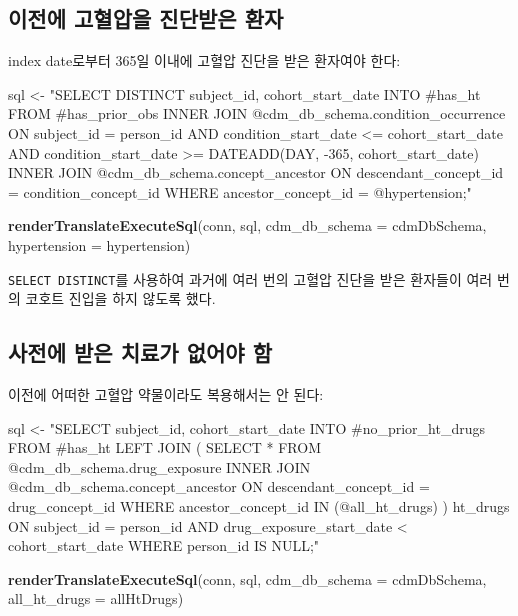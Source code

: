 \documentclass[11pt]{book}
\newenvironment{Shaded}{\begin{snugshade}}{\end{snugshade}}
\newcommand{\KeywordTok}[1]{\textcolor[rgb]{0.13,0.29,0.53}{\textbf{#1}}}
\newcommand{\DataTypeTok}[1]{\textcolor[rgb]{0.13,0.29,0.53}{#1}}
\newcommand{\StringTok}[1]{\textcolor[rgb]{0.31,0.60,0.02}{#1}}
\newcommand{\NormalTok}[1]{#1}
\theoremstyle{definition}
\theoremstyle{definition}
\theoremstyle{definition}
\theoremstyle{remark}
\begin{document}
\subsection{이전에 고혈압을 진단받은 환자}\label{---}

index date로부터 365일 이내에 고혈압 진단을 받은 환자여야 한다:

\begin{Shaded}
\begin{Highlighting}[]
\NormalTok{sql <-}\StringTok{ "SELECT DISTINCT subject_id,}
\StringTok{  cohort_start_date}
\StringTok{INTO #has_ht}
\StringTok{FROM #has_prior_obs}
\StringTok{INNER JOIN @cdm_db_schema.condition_occurrence}
\StringTok{  ON subject_id = person_id}
\StringTok{    AND condition_start_date <= cohort_start_date}
\StringTok{    AND condition_start_date >= DATEADD(DAY, -365, cohort_start_date)}
\StringTok{INNER JOIN @cdm_db_schema.concept_ancestor}
\StringTok{  ON descendant_concept_id = condition_concept_id}
\StringTok{WHERE ancestor_concept_id = @hypertension;"}

\KeywordTok{renderTranslateExecuteSql}\NormalTok{(conn,}
\NormalTok{                          sql,}
                          \DataTypeTok{cdm_db_schema =}\NormalTok{ cdmDbSchema,}
                          \DataTypeTok{hypertension =}\NormalTok{ hypertension)}
\end{Highlighting}
\end{Shaded}

\texttt{SELECT\ DISTINCT}를 사용하여 과거에 여러 번의 고혈압 진단을 받은
환자들이 여러 번의 코호트 진입을 하지 않도록 했다.

\subsection{사전에 받은 치료가 없어야 함}\label{----}

이전에 어떠한 고혈압 약물이라도 복용해서는 안 된다:

\begin{Shaded}
\begin{Highlighting}[]
\NormalTok{sql <-}\StringTok{ "SELECT subject_id,}
\StringTok{  cohort_start_date}
\StringTok{INTO #no_prior_ht_drugs}
\StringTok{FROM #has_ht}
\StringTok{LEFT JOIN (}
\StringTok{  SELECT *}
\StringTok{  FROM @cdm_db_schema.drug_exposure}
\StringTok{  INNER JOIN @cdm_db_schema.concept_ancestor}
\StringTok{    ON descendant_concept_id = drug_concept_id}
\StringTok{  WHERE ancestor_concept_id IN (@all_ht_drugs)}
\StringTok{) ht_drugs}
\StringTok{  ON subject_id = person_id}
\StringTok{    AND drug_exposure_start_date < cohort_start_date}
\StringTok{WHERE person_id IS NULL;"}

\KeywordTok{renderTranslateExecuteSql}\NormalTok{(conn,}
\NormalTok{                          sql,}
                          \DataTypeTok{cdm_db_schema =}\NormalTok{ cdmDbSchema,}
                          \DataTypeTok{all_ht_drugs =}\NormalTok{ allHtDrugs)}
\end{Highlighting}
\end{Shaded}
\end{document}
